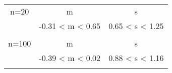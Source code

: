 \begin{table}[H]
\centering
\begin{tabular}{c|c|c}
        n=20 & m & s \\
         & -0.31 < m < 0.65 & 0.65 < s < 1.25 \\
        \hline
        \multicolumn{3}{c}{} \\
        n=100 & m & s \\
         & -0.39 < m < 0.02 & 0.88 < s < 1.16 \\
        \hline
        \multicolumn{3}{c}{} \\
    \end{tabular}
    \caption{}
    \label{}
\end{table}
